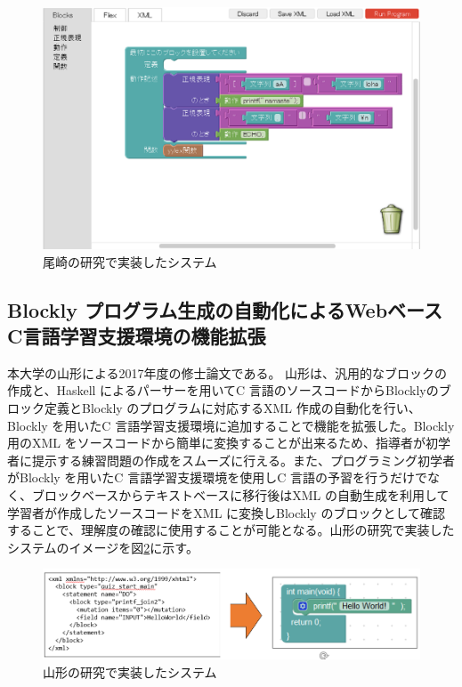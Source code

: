 \documentclass{risepaper}
\begin{document}
\begin{figure}[h]
\begin{center}
\includegraphics[scale=0.5]{img/ozaki.eps}
\caption{尾崎の研究で実装したシステム}%
\label{fig:ozaki}
\end{center}%
\end{figure}%
 
	\subsection{Blockly プログラム生成の自動化によるWebベースC言語学習支援環境の機能拡張}
 
  本大学の山形による2017年度の修士論文\cite{yamagata}である。
 山形は、汎用的なブロックの作成と、Haskell によるパーサーを用いてC 言語のソースコードからBlocklyのブロック定義とBlockly のプログラムに対応するXML 作成の自動化を行い、Blockly を用いたC 言語学習支援環境に追加することで機能を拡張した。Blockly 用のXML をソースコードから簡単に変換することが出来るため、指導者が初学者に提示する練習問題の作成をスムーズに行える。また、プログラミング初学者がBlockly を用いたC 言語学習支援環境を使用しC 言語の予習を行うだけでなく、ブロックベースからテキストベースに移行後はXML の自動生成を利用して学習者が作成したソースコードをXML に変換しBlockly のブロックとして確認することで、理解度の確認に使用することが可能となる。山形の研究で実装したシステムのイメージを図\ref{fig:yamagata}に示す。 
 
\begin{figure}[h]
\begin{center}
\includegraphics[scale=0.8]{img/yamagata.PNG}
\caption{山形の研究で実装したシステム}%
\label{fig:yamagata}
\end{center}%
\end{figure}%
 
\end{document}
